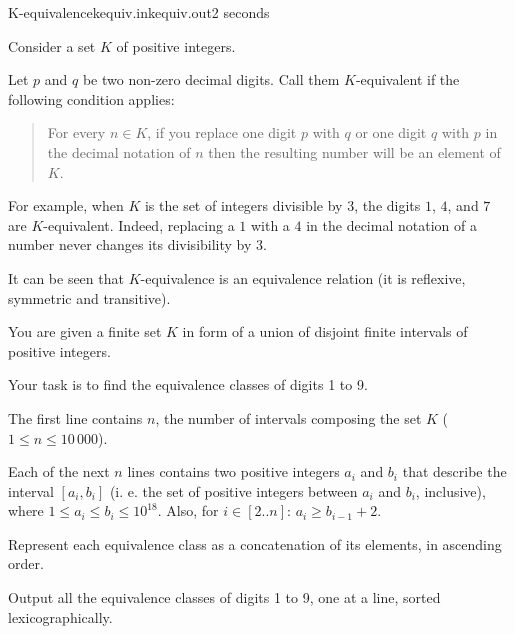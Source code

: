 \begin{problem}{K-equivalence}{kequiv.in}{kequiv.out}{2 seconds}


Consider a set $K$ of positive integers.

Let $p$ and $q$ be two non-zero decimal digits. Call them $K$-equivalent
if the following condition applies:

\begin{quote}
For every $n \in K$, if you replace one digit $p$ with $q$ or one digit $q$ with
$p$ in the decimal notation of $n$ then the resulting number will be
an element of $K$.
\end{quote}

For example, when $K$ is the set of integers divisible by $3$, the digits
$1$, $4$, and $7$ are $K$-equivalent. Indeed, replacing a $1$ with a $4$ in
the decimal notation of a number never changes its divisibility by $3$.

It can be seen that $K$-equivalence is an equivalence relation
(it is reflexive, symmetric and transitive).

You are given a finite set $K$ in form of a union of disjoint finite intervals
of positive integers.

Your task is to find the equivalence classes of digits 1 to 9.

\InputFile

The first line contains $n$, the number of intervals composing the set $K$
($1 \le n \le 10\,000$).

Each of the next $n$ lines contains two positive integers $a_i$ and $b_i$ that
describe the interval $[a_i, b_i]$
(i. e. the set of positive integers between $a_i$ and $b_i$, inclusive), where
$1 \le a_i \le b_i \le 10^{18}$. Also, for $i \in [2..n]$: $a_i \ge b_{i-1} + 2$.

\OutputFile

Represent each equivalence class as a concatenation of its elements,
in ascending order.

Output all the equivalence classes of digits 1 to 9, one at a line, sorted
lexicographically.

\Example

\begin{example}
%
\end{example}

\end{problem}

